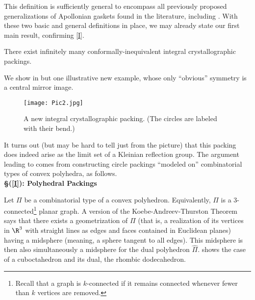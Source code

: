 \documentclass[12pt,reqno]{amsart}
\begin{document}
This definition is sufficiently general to encompass all previously proposed generalizations of Apollonian gaskets found in the literature, including \cite{Boyd1974, Maxwell1982, ChenLabbe2015, GuettlerMallows2010, ButlerGrahamGuettlerMallows2010, Stange2015, Baragar2017}.
With these two basic and general definitions in place, we may already state our first main result, confirming \eqref{I}. %

\begin{thm}\label{thm:infMany}
There exist infinitely many conformally-inequivalent integral crystallographic packings.
\end{thm}

We show in  but one illustrative new example,  whose only ``obvious'' symmetry is 
a central mirror image.
\begin{figure}
\texttt{[image: Pic2.jpg]}
\caption{A new integral crystallographic packing.  (The circles are labeled with their bend.)}
\label{fig:newPack}
\end{figure}
It turns out (but may be hard to tell just from the picture) that this packing does indeed arise as the limit set of a Kleinian reflection group.
The argument leading to  comes from constructing circle packings ``modeled on'' combinatorial types of convex polyhedra, as follows.
\\

\noindent
{\bf \S(\ref{I}): Polyhedral Packings}\label{sec:1.1}\

Let $\Pi$ be a combinatorial type of a convex polyhedron. 
Equivalently, $\Pi$ is a 3-connected\footnote{Recall that a graph is $k$-connected if it remains connected whenever fewer than $k$ vertices are removed.} planar graph.
A version of the Koebe-Andreev-Thurston Theorem says that there exists a geometrization of $\Pi$ (that is, a realization of its vertices in $\R^3$ with straight lines as edges and faces contained in Euclidean planes) having a midsphere (meaning, a sphere tangent to all edges). 
This midsphere is then also simultaneously a midsphere for the dual polyhedron $\widehat\Pi$.
 shows the case of a cuboctahedron and its dual, the rhombic dodecahedron.

\end{document}

